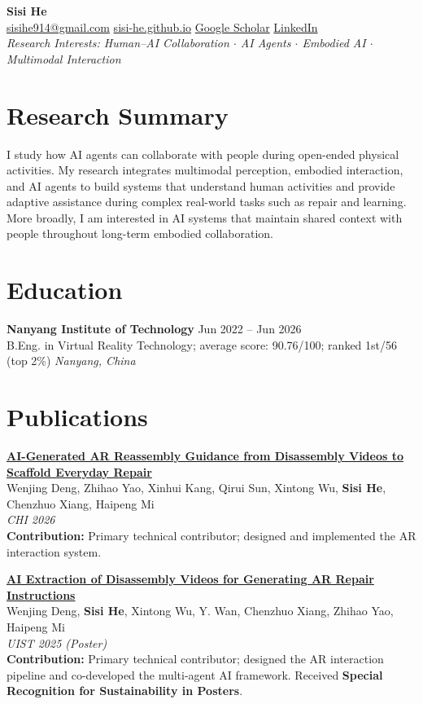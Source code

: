 \documentclass[10pt,letterpaper]{article}
\newcommand{\entry}[4]{
  \textbf{#1} \hfill #2\\
  #3 \hfill \textit{#4}
}
\newcommand{\paper}[4]{
  #1\\
  #2\\
  \textit{#3}\\
  #4
}
\begin{document}
\begin{center}
    {\LARGE \textbf{Sisi He}}\\
    \vspace{2pt}
    \href{mailto:sisihe914@gmail.com}{sisihe914@gmail.com} \quad
    \href{https://sisi-he.github.io/}{sisi-he.github.io} \quad
    \href{https://scholar.google.com/citations?user=iBPi1LYAAAAJ\&hl=zh-CN}{Google Scholar} \quad
    \href{https://www.linkedin.com/in/\%E6\%80\%9D\%E6\%80\%9D-\%E4\%BD\%95-308819419/}{LinkedIn}
    \vspace{2pt}\\
    \textit{Research Interests: Human--AI Collaboration $\cdot$ AI Agents $\cdot$ Embodied AI $\cdot$ Multimodal Interaction}
\end{center}

\section{Research Summary}
I study how AI agents can collaborate with people during open-ended physical activities. My research integrates multimodal perception, embodied interaction, and AI agents to build systems that understand human activities and provide adaptive assistance during complex real-world tasks such as repair and learning. More broadly, I am interested in AI systems that maintain shared context with people throughout long-term embodied collaboration.

\section{Education}
\entry{Nanyang Institute of Technology}{Jun 2022 -- Jun 2026}
{B.Eng. in Virtual Reality Technology; average score: 90.76/100; ranked 1st/56 (top 2\%)}{Nanyang, China}

\section{Publications}

\paper{\href{https://doi.org/10.1145/3772318.3790494}{\textbf{AI-Generated AR Reassembly Guidance from Disassembly Videos to Scaffold Everyday Repair}}}
{Wenjing Deng, Zhihao Yao, Xinhui Kang, Qirui Sun, Xintong Wu, \textbf{Sisi He}, Chenzhuo Xiang, Haipeng Mi}
{CHI 2026}
{\textbf{Contribution:} Primary technical contributor; designed and implemented the AR interaction system.}
\vspace{4pt}

\paper{\href{https://doi.org/10.1145/3746058.3758436}{\textbf{AI Extraction of Disassembly Videos for Generating AR Repair Instructions}}}
{Wenjing Deng, \textbf{Sisi He}, Xintong Wu, Y. Wan, Chenzhuo Xiang, Zhihao Yao, Haipeng Mi}
{UIST 2025 (Poster)}
{\textbf{Contribution:} Primary technical contributor; designed the AR interaction pipeline and co-developed the multi-agent AI framework. Received \textbf{Special Recognition for Sustainability in Posters}.}
\vspace{4pt}
\end{document}
